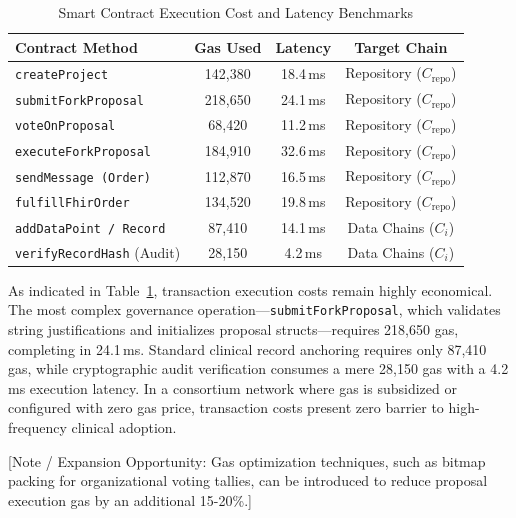 \begin{table}[htbp]
\centering
\caption{Smart Contract Execution Cost and Latency Benchmarks}
\label{tab:gas_cost}
\footnotesize
\setlength{\tabcolsep}{3pt}
\begin{tabularx}{\columnwidth}{Xccc}
\toprule
\textbf{Contract Method} & \textbf{Gas Used} & \textbf{Latency} & \textbf{Target Chain} \\
\midrule
\texttt{createProject}            & 142,380 & 18.4\,ms & Repository ($C_{\text{repo}}$) \\
\texttt{submitForkProposal}       & 218,650 & 24.1\,ms & Repository ($C_{\text{repo}}$) \\
\texttt{voteOnProposal}           & 68,420  & 11.2\,ms & Repository ($C_{\text{repo}}$) \\
\texttt{executeForkProposal}      & 184,910 & 32.6\,ms & Repository ($C_{\text{repo}}$) \\
\texttt{sendMessage (Order)}      & 112,870 & 16.5\,ms & Repository ($C_{\text{repo}}$) \\
\texttt{fulfillFhirOrder}         & 134,520 & 19.8\,ms & Repository ($C_{\text{repo}}$) \\
\texttt{addDataPoint / Record}    & 87,410  & 14.1\,ms & Data Chains ($C_i$) \\
\texttt{verifyRecordHash} (Audit) & 28,150  & 4.2\,ms  & Data Chains ($C_i$) \\
\bottomrule
\end{tabularx}
\end{table}

As indicated in Table~\ref{tab:gas_cost}, transaction execution costs remain highly economical. The most complex governance operation—\texttt{submitForkProposal}, which validates string justifications and initializes proposal structs—requires 218,650 gas, completing in 24.1\,ms. Standard clinical record anchoring requires only 87,410 gas, while cryptographic audit verification consumes a mere 28,150 gas with a 4.2\,ms execution latency. In a consortium network where gas is subsidized or configured with zero gas price, transaction costs present zero barrier to high-frequency clinical adoption.

[Note / Expansion Opportunity: Gas optimization techniques, such as bitmap packing for organizational voting tallies, can be introduced to reduce proposal execution gas by an additional 15-20\%.]
